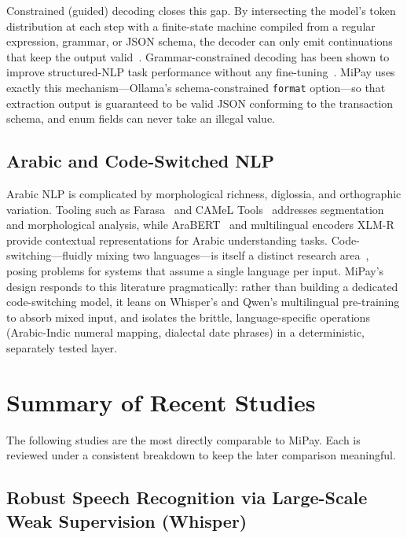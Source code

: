Constrained (guided) decoding closes this gap. By intersecting the model's
token distribution at each step with a finite-state machine compiled from a
regular expression, grammar, or JSON schema, the decoder can only emit
continuations that keep the output valid~\cite{willard2023outlines}.
Grammar-constrained decoding has been shown to improve structured-NLP task
performance without any fine-tuning~\cite{geng2023grammar}. MiPay uses exactly
this mechanism---Ollama's schema-constrained \texttt{format} option---so that
extraction output is guaranteed to be valid JSON conforming to the transaction
schema, and enum fields can never take an illegal value.

\subsection{Arabic and Code-Switched NLP}

Arabic NLP is complicated by morphological richness, diglossia, and orthographic
variation. Tooling such as Farasa~\cite{abdelali2016farasa} and CAMeL
Tools~\cite{obeid2020camel} addresses segmentation and morphological analysis,
while AraBERT~\cite{antoun2020arabert} and multilingual encoders
XLM-R~\cite{conneau2020xlmr} provide contextual representations for Arabic
understanding tasks. Code-switching---fluidly mixing two languages---is itself a
distinct research area~\cite{sitaram2019codeswitch}, posing problems for systems
that assume a single language per input. MiPay's design responds to this
literature pragmatically: rather than building a dedicated code-switching model,
it leans on Whisper's and Qwen's multilingual pre-training to absorb mixed input,
and isolates the brittle, language-specific operations (Arabic-Indic numeral
mapping, dialectal date phrases) in a deterministic, separately tested layer.

\section{Summary of Recent Studies}

The following studies are the most directly comparable to MiPay. Each is reviewed
under a consistent breakdown to keep the later comparison meaningful.

\subsection{Robust Speech Recognition via Large-Scale Weak Supervision (Whisper)}

